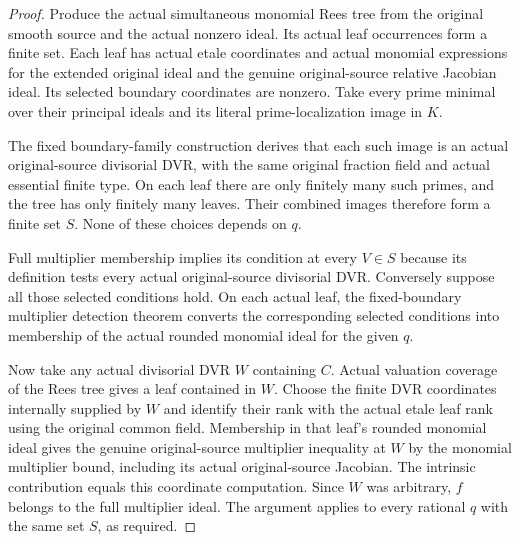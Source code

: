 \begin{proof}
Produce the actual simultaneous monomial Rees tree from the original
smooth source and the actual nonzero ideal. Its actual leaf occurrences
form a finite set. Each leaf has actual etale coordinates and actual
monomial expressions for the extended original ideal and the genuine
original-source relative Jacobian ideal. Its selected boundary
coordinates are nonzero. Take every prime minimal over their principal
ideals and its literal prime-localization image in $K$.

The fixed boundary-family construction derives that each such image is
an actual original-source divisorial DVR, with the same original
fraction field and actual essential finite type. On each leaf there
are only finitely many such primes, and the tree has only finitely many
leaves. Their combined images therefore form a finite set $S$. None
of these choices depends on $q$.

Full multiplier membership implies its condition at every $V\in S$
because its definition tests every actual original-source divisorial
DVR. Conversely suppose all those selected conditions hold. On each
actual leaf, the fixed-boundary multiplier detection theorem converts
the corresponding selected conditions into membership of the actual
rounded monomial ideal for the given $q$.

Now take any actual divisorial DVR $W$ containing $C$. Actual valuation
coverage of the Rees tree gives a leaf contained in $W$. Choose the
finite DVR coordinates internally supplied by $W$ and identify their
rank with the actual etale leaf rank using the original common field.
Membership in that leaf's rounded monomial ideal gives the genuine
original-source multiplier inequality at $W$ by the monomial multiplier
bound, including its actual original-source Jacobian. The intrinsic
contribution equals this coordinate computation. Since $W$ was arbitrary,
$f$ belongs to the full multiplier ideal. The argument applies to every
rational $q$ with the same set $S$, as required.
\end{proof}
